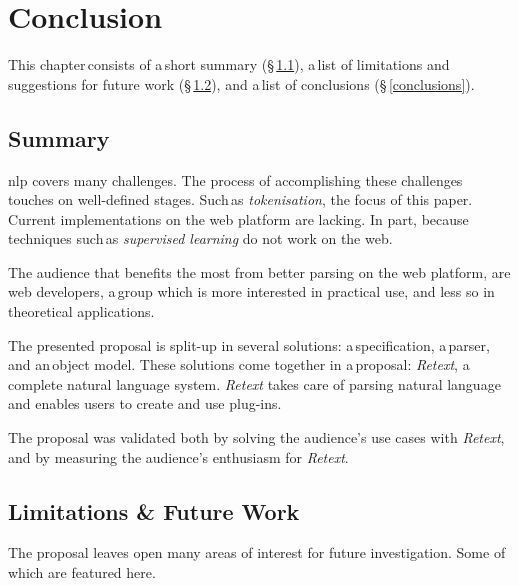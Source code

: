 \chapter{Conclusion}\label{conclusion}

This chapter\,consists of a\,short summary (§\,\ref{summary}), a\,list of
  limitations and suggestions for future work
  (§\,\ref{limitations-future-work}), and a\,list of conclusions
  (§\,\ref{conclusions}).

\section{Summary}\label{summary}

\gls{nlp} covers many challenges.
The process of accomplishing these challenges touches on well-defined stages.
Such\,as \emph{tokenisation}, the focus of this paper.
Current implementations on the web platform are lacking.
In part, because techniques such\,as \emph{supervised learning} do not work
  on the web.

The audience that benefits the most from better parsing on the web platform,
  are web developers, a\,group which is more interested in practical use, and
  less so in theoretical applications.

The presented proposal is split-up in several solutions: a\,specification,
  a\,parser, and an\,object model.
These solutions come together in a\,proposal: \emph{Retext}, a\,complete
  natural language system.
\emph{Retext} takes care of parsing natural language and enables users to
  create and use plug-ins.

The proposal was validated both by solving the audience's use cases with
  \emph{Retext}, and by measuring the audience's enthusiasm for \emph{Retext}.

\section{Limitations \& Future Work}\label{limitations-future-work}

The proposal leaves open many areas of interest for future investigation.
Some of which are featured here.

